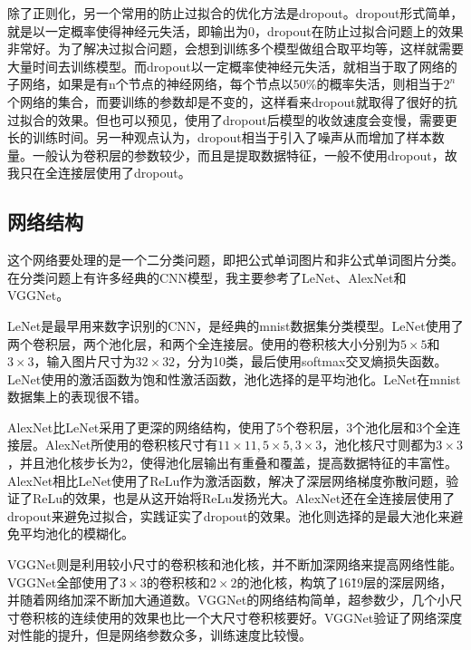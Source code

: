 \documentclass[12pt]{article}
\begin{document}
除了正则化，另一个常用的防止过拟合的优化方法是dropout。\cite{dropout}dropout形式简单，就是以一定概率使得神经元失活，即输出为0，dropout在防止过拟合问题上的效果非常好。为了解决过拟合问题，会想到训练多个模型做组合取平均等，这样就需要大量时间去训练模型。而dropout以一定概率使神经元失活，就相当于取了网络的子网络，如果是有n个节点的神经网络，每个节点以50\%的概率失活，则相当于$2^n$个网络的集合，而要训练的参数却是不变的，这样看来dropout就取得了很好的抗过拟合的效果。但也可以预见，使用了dropout后模型的收敛速度会变慢，需要更长的训练时间。另一种观点认为，dropout相当于引入了噪声从而增加了样本数量。一般认为卷积层的参数较少，而且是提取数据特征，一般不使用dropout，故我只在全连接层使用了dropout。

\subsection{网络结构}
\noindent

这个网络要处理的是一个二分类问题，即把公式单词图片和非公式单词图片分类。在分类问题上有许多经典的CNN模型，我主要参考了LeNet、AlexNet和VGGNet。

LeNet是最早用来数字识别的CNN，是经典的mnist数据集分类模型。LeNet使用了两个卷积层，两个池化层，和两个全连接层。使用的卷积核大小分别为$5 \times 5$和$3 \times 3$，输入图片尺寸为$32 \times 32$，分为10类，最后使用softmax交叉熵损失函数。LeNet使用的激活函数为饱和性激活函数，池化选择的是平均池化。LeNet在mnist数据集上的表现很不错。

AlexNet比LeNet采用了更深的网络结构，使用了5个卷积层，3个池化层和3个全连接层。AlexNet所使用的卷积核尺寸有$11 \times 11, 5 \times 5, 3 \times 3$，池化核尺寸则都为$3 \times 3$，并且池化核步长为2，使得池化层输出有重叠和覆盖，提高数据特征的丰富性。AlexNet相比LeNet使用了ReLu作为激活函数，解决了深层网络梯度弥散问题，验证了ReLu的效果，也是从这开始将ReLu发扬光大。AlexNet还在全连接层使用了dropout来避免过拟合，实践证实了dropout的效果。池化则选择的是最大池化来避免平均池化的模糊化。

VGGNet则是利用较小尺寸的卷积核和池化核，并不断加深网络来提高网络性能。VGGNet全部使用了$3 \times 3$的卷积核和$2 \times 2$的池化核，构筑了16\~19层的深层网络，并随着网络加深不断加大通道数。VGGNet的网络结构简单，超参数少，几个小尺寸卷积核的连续使用的效果也比一个大尺寸卷积核要好。VGGNet验证了网络深度对性能的提升，但是网络参数众多，训练速度比较慢。
\end{document}
